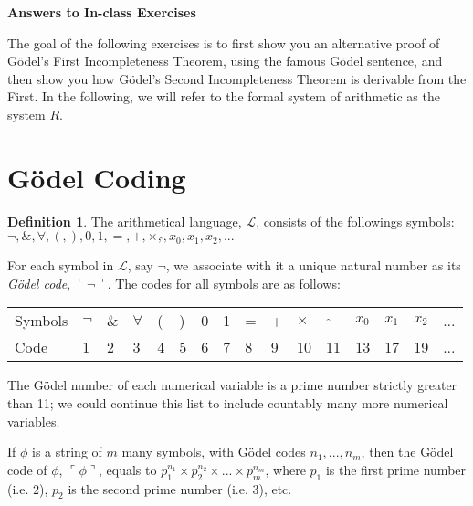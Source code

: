 \documentclass[11pt]{article}
\theoremstyle{definition}
\newtheorem{defn}{Definition}
\begin{document}




\begin{center}
{\LARGE \bf Answers to In-class Exercises}
\end{center}

\smallskip


The goal of the following exercises is to first show you an alternative proof of G\"odel's First Incompleteness Theorem, using the famous G\"odel sentence, and then show you how G\"odel's Second Incompleteness Theorem is derivable from the First. In the following, we will refer to the formal system of arithmetic as the system $R$.

\section{G\"odel Coding}

\begin{defn}
The arithmetical language, $\mathscr{L}$, consists of the followings symbols: $\neg, \&, \forall, (, ), 0, 1, =, +, \times, \hat{\text{}}, x_0, x_1, x_2, ...$
\end{defn}

For each symbol in $\mathscr{L}$, say $\neg$, we associate with it a unique natural number as its \textit{G\"odel code}, $\ulcorner \neg \urcorner$. The codes for all symbols are as follows: 
\begin{table}[h]
\begin{tabular}{llllllllllllllll}
Symbols    & $\neg$ & $\&$  & $\forall$  & (  &  )  & 0 & 1 & = & + & $\times$  & $\, \, \hat{\text{}}$  &  $x_0$  &  $x_1$  &  $x_2$  & ...         \\
Code    & 1 & 2 & 3 & 4 & 5 & 6 & 7 & 8 & 9 & 10 & 11 & 13 & 17 & 19 & ...
\end{tabular}
\end{table}

The G\"odel number of each numerical variable is a prime number strictly greater than 11; we could continue this list to include countably many more numerical variables.

If $\phi$ is a string of $m$ many symbols, with G\"odel codes $n_1, ..., n_m$, then the G\"odel code of $\phi$, $\ulcorner \phi \urcorner$, equals to $p_1^{n_1} \times p_2^{n_2} \times ...\times p_m^{n_m}$, where $p_1$ is the first prime number (i.e. 2), $p_2$ is the second prime number (i.e. 3), etc.
\end{document}
